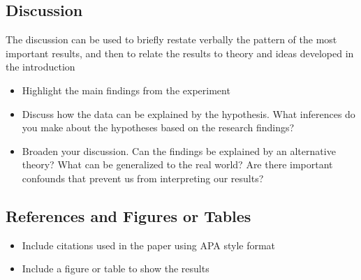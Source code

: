 \subsection{Discussion}

The discussion can be used to briefly restate verbally the pattern of the most important results, and then to relate the results to theory and ideas developed in the introduction

\begin{itemize}
\item Highlight the main findings from the experiment
\item Discuss how the data can be explained by the hypothesis. What inferences do you make about the hypotheses based on the research findings?
\item Broaden your discussion. Can the findings be explained by an alternative theory? What can be generalized to the real world? Are there important confounds that prevent us from interpreting our results?
\end{itemize}

\subsection{References and Figures or Tables}

\begin{itemize}
\item Include citations used in the paper using APA style format
\item Include a figure or table to show the results
\end{itemize}

%



